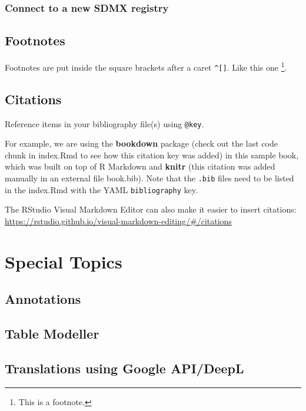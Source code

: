 \documentclass[
]{book}
\theoremstyle{definition}
\theoremstyle{definition}
\theoremstyle{definition}
\theoremstyle{definition}
\theoremstyle{remark}
\begin{document}
\hypertarget{connect}{%
\subsection{Connect to a new SDMX registry}\label{connect}}

\hypertarget{footnotes}{%
\section{Footnotes}\label{footnotes}}

Footnotes are put inside the square brackets after a caret \texttt{\^{}{[}{]}}. Like this one \footnote{This is a footnote.}.

\hypertarget{citations}{%
\section{Citations}\label{citations}}

Reference items in your bibliography file(s) using \texttt{@key}.

For example, we are using the \textbf{bookdown} package \citep{R-bookdown} (check out the last code chunk in index.Rmd to see how this citation key was added) in this sample book, which was built on top of R Markdown and \textbf{knitr} \citep{xie2015} (this citation was added manually in an external file book.bib).
Note that the \texttt{.bib} files need to be listed in the index.Rmd with the YAML \texttt{bibliography} key.

The RStudio Visual Markdown Editor can also make it easier to insert citations: \url{https://rstudio.github.io/visual-markdown-editing/\#/citations}

\hypertarget{special-topics}{%
\chapter{Special Topics}\label{special-topics}}

\hypertarget{annotations}{%
\section{Annotations}\label{annotations}}

\hypertarget{table-modeller}{%
\section{Table Modeller}\label{table-modeller}}

\hypertarget{translations-using-google-apideepl}{%
\section{Translations using Google API/DeepL}\label{translations-using-google-apideepl}}
\end{document}
